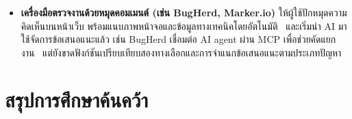 {\begin{itemize}
    \item \textbf{เครื่องมือตรวจงานด้วยหมุดคอมเมนต์ (เช่น BugHerd, Marker.io)} ให้ผู้ใช้ปักหมุดความคิดเห็นบนหน้าเว็บ พร้อมแนบภาพหน้าจอและข้อมูลทางเทคนิคโดยอัตโนมัติ~\cite{bugherd,markerio} และเริ่มนำ AI มาใช้จัดการข้อเสนอแนะแล้ว เช่น BugHerd เชื่อมต่อ AI agent ผ่าน MCP เพื่อช่วยคัดแยกงาน~\cite{bugherd_ai} แต่ยังขาดฟังก์ชันเปรียบเทียบสองทางเลือกและการจำแนกข้อเสนอแนะตามประเภทปัญหา
  \end{itemize}
}

\section{สรุปการศึกษาค้นคว้า}





